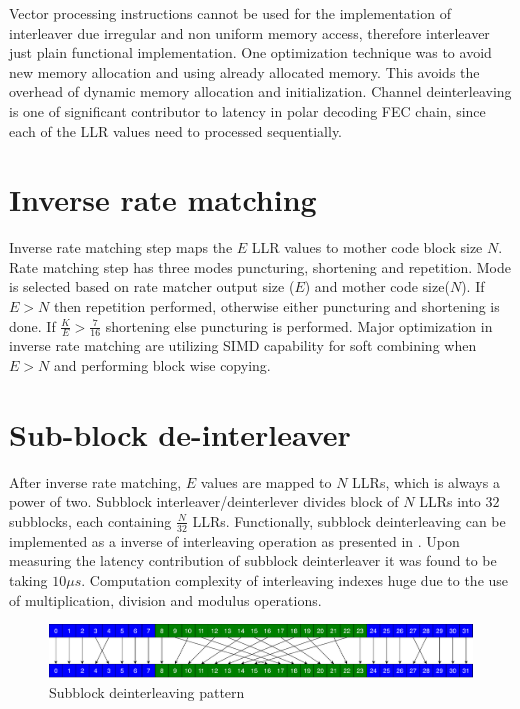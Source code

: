 Vector processing instructions cannot be used for the implementation of interleaver due irregular and non uniform memory access, therefore interleaver just plain functional implementation. One optimization technique was to avoid new memory allocation and using already allocated memory. This avoids the overhead of dynamic memory allocation and initialization. Channel deinterleaving is one of significant contributor to latency in polar decoding FEC chain, since each of the LLR values need to processed sequentially.

\section{Inverse rate matching}
Inverse rate matching step maps the $E$ LLR values to mother code block size $ N $. Rate matching step has three modes puncturing, shortening and repetition. Mode is selected based on rate matcher output size ($E$) and mother code size($ N $). If $E > N$ then repetition performed, otherwise either puncturing and shortening is done. If $ \frac{K}{E} > \frac{7}{16} $ shortening else puncturing is performed. Major optimization in inverse rate matching are utilizing SIMD capability for soft combining when $ E>N $ and performing block wise copying. 
%
%
\section{Sub-block de-interleaver}
After inverse rate matching, $E$ values are mapped to $N$ LLRs, which is always a power of two. Subblock interleaver/deinterlever divides block of $N$ LLRs into $32$ subblocks, each containing $\frac{N}{32}$ LLRs. Functionally, subblock deinterleaving can be implemented as a inverse of interleaving operation as presented in \cite{3gpp.38.212}. Upon measuring the latency contribution of subblock deinterleaver it was found to be taking $10 \mu s$. Computation complexity of interleaving indexes huge due to the use of multiplication, division and modulus operations. \newline

\begin{figure}[]
	\centering
	\includegraphics[width=1.0\textwidth]{./figures/subblockDeinterleaver.pdf}
	\caption{Subblock deinterleaving pattern}
	\label{fig:subblockDeinterleaver}
\end{figure}

